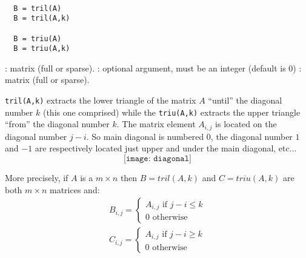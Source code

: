 \begin{mandesc}
  \\
\end{mandesc}
\begin{calling_sequence}
\begin{verbatim}
  B = tril(A)
  B = tril(A,k)
  
  B = triu(A)
  B = triu(A,k)
\end{verbatim}
\end{calling_sequence}
\begin{parameters}
  \begin{varlist}
     : matrix (full or sparse).
     : optional argument, must be an integer (default is $0$)
     : matrix (full or sparse).
  \end{varlist}
\end{parameters}
\begin{mandescription}
  \verb+tril(A,k)+ extracts the lower triangle of the matrix $A$ ``until'' the diagonal number $k$
  (this one comprised) while the \verb+triu(A,k)+ extracts the upper triangle ``from'' the  diagonal
  number $k$. The matrix element $A_{i,j}$ is located on the diagonal number $j-i$. So main 
  diagonal is numbered $0$, the diagonal number $1$ and $-1$ are respectively located just 
  upper and under the main diagonal, etc...
$$
\texttt{[image: diagonal]} 
$$

 More precisely, if $A$ is a $m \times n$ then 
  $B = tril(A,k)$ and $C=triu(A,k)$ are both $m \times n$ matrices and:
  $$
   \begin{array}{l}
      B_{i,j} = \left\{ \begin{array}{l} A_{i,j} \mbox{ if } j-i \le k \\
                                           0    \mbox{ otherwise}
                       \end{array} \right.   \\
      C_{i,j} = \left\{ \begin{array}{l} A_{i,j} \mbox{ if } j-i \ge k \\
                                           0    \mbox{ otherwise}
                       \end{array} \right. 
   \end{array}
  $$

\end{mandescription}
\begin{examples}
  \begin{program}
  \end{program}
\end{examples}

\begin{manseealso}
\end{manseealso}

